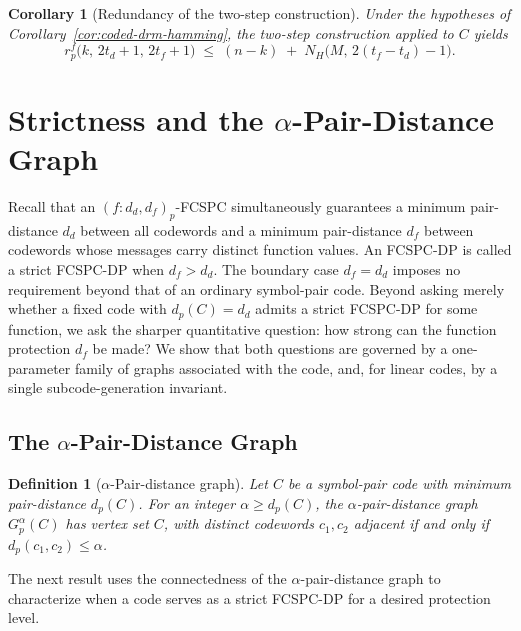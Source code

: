 \documentclass[11pt,draftclsnofoot,journal,onecolumn]{IEEEtran}
\newtheorem{definition}{Definition}
\newtheorem{corollary}{Corollary}
\begin{document}
    \begin{corollary}[Redundancy of the two-step construction]
    \label{cor:two-step-hamming}
    Under the hypotheses of Corollary~\ref{cor:coded-drm-hamming}, the two-step construction applied to $C$ yields
    \[
    r^f_p\bigl(k,\,2t_d+1,\,2t_f+1\bigr) \;\le\; (n-k)\;+\;N_H\bigl(M,\,2(t_f-t_d)-1\bigr).
    \]
    \end{corollary}




    
    



\section{Strictness and the $\alpha$-Pair-Distance Graph}
\label{sec:invariants}



    Recall that an $(f:d_d,d_f)_p$-FCSPC simultaneously guarantees a minimum pair-distance $d_d$ between all codewords and a minimum pair-distance $d_f$ between codewords whose messages carry distinct function values. An FCSPC-DP is called a strict FCSPC-DP when $d_f>d_d$. The boundary case $d_f=d_d$ imposes no requirement beyond that of an ordinary symbol-pair code. Beyond asking merely whether a fixed code with $d_p(C)=d_d$ admits a strict FCSPC-DP for some function, we ask the sharper quantitative question: how strong can the function protection $d_f$ be made? We show that both questions are governed by a one-parameter family of graphs associated with the code, and, for linear codes, by a single subcode-generation invariant.


 \subsection{The $\alpha$-Pair-Distance Graph}

    \begin{definition}[$\alpha$-Pair-distance graph]\label{def:alpha-pair-graph} Let $C$ be a symbol-pair code with minimum pair-distance $d_p(C)$. For an integer $\alpha\ge d_p(C)$, the $\alpha$-pair-distance graph $G_p^{\alpha}(C)$ has vertex set $C$, with distinct codewords $c_1,c_2$ adjacent if and only if $d_p(c_1,c_2)\le\alpha$.
    \end{definition}

    The next result uses the connectedness of the $\alpha$-pair-distance graph to characterize when a code serves as a strict FCSPC-DP for a desired protection level.
\end{document}
